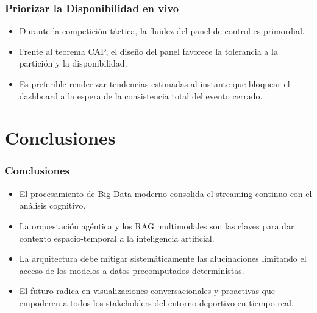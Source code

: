 \documentclass[aspectratio=169]{beamer}
\begin{document}
\begin{frame}\frametitle{Priorizar la Disponibilidad en vivo}
\begin{itemize}
    \item Durante la competición táctica, la fluidez del panel de control es primordial.
    \item Frente al teorema CAP, el diseño del panel favorece la tolerancia a la partición y la disponibilidad.
    \item Es preferible renderizar tendencias estimadas al instante que bloquear el dashboard a la espera de la consistencia total del evento cerrado.
\end{itemize}
\end{frame}

\section{Conclusiones}
\frame{\sectionpage}

\begin{frame}\frametitle{Conclusiones}
\begin{itemize}
    \item El procesamiento de Big Data moderno consolida el streaming continuo con el análisis cognitivo.
    \item La orquestación agéntica y los RAG multimodales son las claves para dar contexto espacio-temporal a la inteligencia artificial.
    \item La arquitectura debe mitigar sistemáticamente las alucinaciones limitando el acceso de los modelos a datos precomputados deterministas.
    \item El futuro radica en visualizaciones conversacionales y proactivas que empoderen a todos los stakeholders del entorno deportivo en tiempo real.
\end{itemize}
\end{frame}
\end{document}
